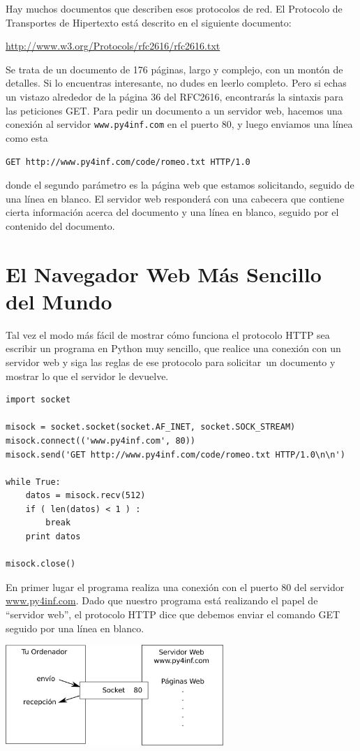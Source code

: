 Hay muchos documentos que describen esos protocolos de red. El Protocolo de Transportes de
Hipertexto está descrito en el siguiente documento:

\url{http://www.w3.org/Protocols/rfc2616/rfc2616.txt}

Se trata de un documento de 176 páginas, largo y complejo, con un montón de detalles. Si lo
encuentras interesante, no dudes en leerlo completo. Pero si echas un vistazo alrededor de la
página 36 del RFC2616, encontrarás la sintaxis para las peticiones GET. Para pedir un documento a un
servidor web, hacemos una conexión al servidor {\tt www.py4inf.com} en el puerto 80, y luego
enviamos una línea como esta

{\tt GET http://www.py4inf.com/code/romeo.txt HTTP/1.0 }

donde el segundo parámetro es la página web que estamos solicitando, seguido
de una línea en blanco. El servidor web responderá con una cabecera que contiene cierta
información acerca del documento y una línea en blanco,
seguido por el contenido del documento.

\section{El Navegador Web Más Sencillo del Mundo}

Tal vez el modo más fácil de mostrar cómo funciona el protocolo HTTP sea escribir un
programa en Python muy sencillo, que realice una conexión con un servidor web y siga
las reglas de ese protocolo para solicitar\ un documento
y mostrar lo que el servidor le devuelve.

\beforeverb
\begin{verbatim}
import socket

misock = socket.socket(socket.AF_INET, socket.SOCK_STREAM)
misock.connect(('www.py4inf.com', 80))
misock.send('GET http://www.py4inf.com/code/romeo.txt HTTP/1.0\n\n')

while True:
    datos = misock.recv(512)
    if ( len(datos) < 1 ) :
        break
    print datos

misock.close()
\end{verbatim}
\afterverb
%
En primer lugar el programa realiza una conexión con el puerto 80 del
servidor \url{www.py4inf.com}.
Dado que nuestro programa está realizando el papel de ``servidor web'', el
protocolo HTTP dice que debemos enviar el comando GET seguido por una línea en blanco.

\beforefig
\centerline{\includegraphics[height=1.50in]{figs2/socket.eps}}
\afterfig

